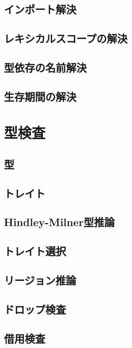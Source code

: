 \documentclass[dvipdfmx,uplatex,papersize,a4paper,10pt]{jsbook}
\theoremstyle{definition}
\begin{document}
\section{インポート解決}

\section{レキシカルスコープの解決}

\section{型依存の名前解決}

\section{生存期間の解決}



\chapter{型検査}

\section{型}

\section{トレイト}

\section{Hindley-Milner型推論}

\section{トレイト選択}

\section{リージョン推論}

\section{ドロップ検査}

\section{借用検査}
\end{document}
